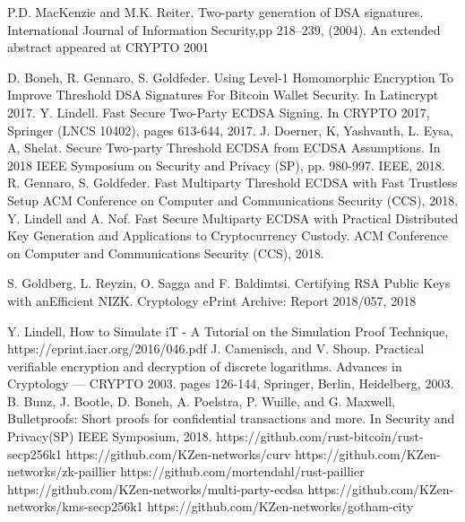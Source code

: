 \documentclass[runningheads]{llncs}
\begin{document}
\begin{thebibliography}{8}
P.D. MacKenzie and M.K. Reiter. Two-party generation of DSA signatures. International
Journal of Information Security,pp 218–239, (2004). An extended
abstract appeared at CRYPTO 2001

D. Boneh, R. Gennaro, S. Goldfeder. Using Level-1 Homomorphic Encryption To
Improve Threshold DSA Signatures For Bitcoin
Wallet Security. In Latincrypt 2017.
Y. Lindell. Fast Secure Two-Party ECDSA Signing.
In CRYPTO 2017, Springer (LNCS 10402), pages 613-644, 2017.
J. Doerner, K, Yashvanth, L. Eysa, A, Shelat. Secure Two-party Threshold ECDSA from ECDSA Assumptions. In 2018 IEEE Symposium on Security and Privacy (SP), pp. 980-997. IEEE, 2018.
R. Gennaro, S. Goldfeder. Fast Multiparty Threshold ECDSA with Fast Trustless Setup
ACM Conference on Computer and Communications Security (CCS), 2018.
Y. Lindell and A. Nof. Fast Secure Multiparty ECDSA with Practical Distributed Key Generation and Applications to Cryptocurrency Custody.
ACM Conference on Computer and Communications Security (CCS), 2018.

S. Goldberg, L. Reyzin, O. Sagga and F. Baldimtsi. Certifying RSA Public Keys with anEfficient NIZK. Cryptology ePrint Archive: Report 2018/057, 2018

Y. Lindell, How to Simulate iT - A Tutorial on the Simulation Proof Technique, https://eprint.iacr.org/2016/046.pdf
J. Camenisch, and V. Shoup. Practical verifiable encryption and decryption of discrete logarithms. Advances in Cryptology — CRYPTO 2003. pages 126-144, Springer, Berlin, Heidelberg, 2003.
B. Bunz, J. Bootle, D. Boneh, A. Poelstra, P. Wuille, and G. Maxwell,
Bulletproofs: Short proofs for confidential transactions and more. In Security and Privacy(SP) IEEE Symposium, 2018.
https://github.com/rust-bitcoin/rust-secp256k1
https://github.com/KZen-networks/curv
https://github.com/KZen-networks/zk-paillier
https://github.com/mortendahl/rust-paillier
https://github.com/KZen-networks/multi-party-ecdsa
https://github.com/KZen-networks/kms-secp256k1
https://github.com/KZen-networks/gotham-city
\end{thebibliography}
\end{document}
